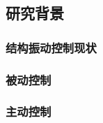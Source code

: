 \subsection{研究背景}
	\subsubsection{结构振动控制现状}


	\subsubsection{被动控制}


	\subsubsection{主动控制}
	    
	    
	    
    